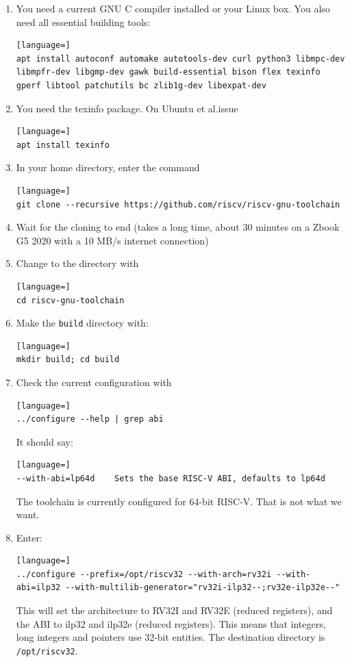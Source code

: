 \documentclass[12pt]{article}
\begin{document}
\begin{enumerate}
\item You need a current GNU C compiler installed or your Linux box. You also need all essential building tools:
\begin{lstlisting}[language=]
apt install autoconf automake autotools-dev curl python3 libmpc-dev libmpfr-dev libgmp-dev gawk build-essential bison flex texinfo gperf libtool patchutils bc zlib1g-dev libexpat-dev
\end{lstlisting}
\item You need the texinfo package. On Ubuntu et al.\@ issue
\begin{lstlisting}[language=]
apt install texinfo
\end{lstlisting}
\item In your home directory, enter the command
\begin{lstlisting}[language=]
git clone --recursive https://github.com/riscv/riscv-gnu-toolchain
\end{lstlisting}
\item Wait for the cloning to end (takes a long time, about 30 minutes on a Zbook G5 2020 with a 10 MB/s internet connection)
\item Change to the directory with
\begin{lstlisting}[language=]
cd riscv-gnu-toolchain
\end{lstlisting}
\item Make the \texttt{build} directory with:
\begin{lstlisting}[language=]
mkdir build; cd build
\end{lstlisting}
\item Check the current configuration with
\begin{lstlisting}[language=]
../configure --help | grep abi
\end{lstlisting}
      It should say:
\begin{lstlisting}[language=]
--with-abi=lp64d    Sets the base RISC-V ABI, defaults to lp64d
\end{lstlisting}
The toolchain is currently configured for 64-bit RISC-V. That is not what we want.
\item Enter:
\begin{lstlisting}[language=]
../configure --prefix=/opt/riscv32 --with-arch=rv32i --with-abi=ilp32 --with-multilib-generator="rv32i-ilp32--;rv32e-ilp32e--"
\end{lstlisting}
This will set the architecture to RV32I and RV32E (reduced registers), and the ABI to ilp32 and ilp32e (reduced registers). This means that integers, long integers and pointers use 32-bit entities. The destination directory is \lstinline|/opt/riscv32|.


\end{enumerate}
\end{document}
